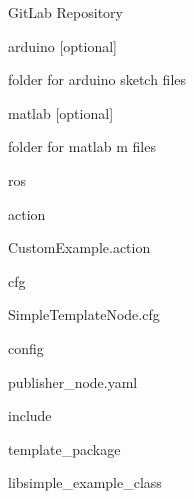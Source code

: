 \begin{DoxyEnumerate}
\item Git\+Lab Repository
\begin{DoxyEnumerate}
\item arduino \mbox{[}optional\mbox{]}
\begin{DoxyItemize}
\item folder for arduino sketch files
\end{DoxyItemize}
\end{DoxyEnumerate}
\begin{DoxyEnumerate}
\item matlab \mbox{[}optional\mbox{]}
\begin{DoxyItemize}
\item folder for matlab m files
\end{DoxyItemize}
\end{DoxyEnumerate}
\begin{DoxyEnumerate}
\item ros
\begin{DoxyEnumerate}
\item action
\begin{DoxyEnumerate}
\item Custom\+Example.\+action
\end{DoxyEnumerate}
\end{DoxyEnumerate}
\begin{DoxyEnumerate}
\item cfg
\begin{DoxyEnumerate}
\item Simple\+Template\+Node.\+cfg
\end{DoxyEnumerate}
\end{DoxyEnumerate}
\begin{DoxyEnumerate}
\item config
\begin{DoxyEnumerate}
\item publisher\+\_\+node.\+yaml
\end{DoxyEnumerate}
\end{DoxyEnumerate}
\begin{DoxyEnumerate}
\item include
\begin{DoxyEnumerate}
\item template\+\_\+package
\begin{DoxyEnumerate}
\item libsimple\+\_\+example\+\_\+class
\end{DoxyEnumerate}
\begin{DoxyEnumerate}

\end{DoxyEnumerate}
\end{DoxyEnumerate}
\end{DoxyEnumerate}
\end{DoxyEnumerate}
\end{DoxyEnumerate}
